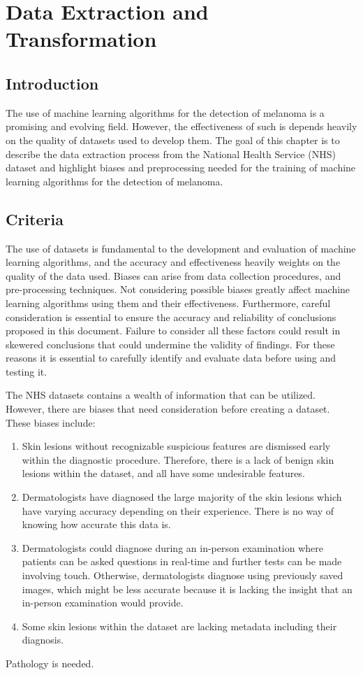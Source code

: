 \chapter{Data Extraction and Transformation}

\section{Introduction}
The use of machine learning algorithms for the detection of melanoma is a promising and evolving field. However, the effectiveness of such is depends heavily on the quality of datasets used to develop them. The goal of this chapter is to describe the data extraction process from the National Health Service (NHS) dataset and highlight biases and preprocessing needed for the training of machine learning algorithms for the detection of melanoma.  

\section{Criteria}
The use of datasets is fundamental to the development and evaluation of machine learning algorithms, and the accuracy and effectiveness heavily weights on the quality of the data used. Biases can arise from data collection procedures, and pre-processing techniques. Not considering possible biases greatly affect machine learning algorithms using them and their effectiveness. Furthermore, careful consideration is essential to ensure the accuracy and reliability of conclusions proposed in this document. Failure to consider all these factors could result in skewered conclusions that could undermine the validity of findings. For these reasons it is essential to carefully identify and evaluate data before using and testing it.

The NHS datasets contains a wealth of information that can be utilized. However, there are biases that need consideration before creating a dataset. These biases include:
\begin{enumerate}
    \item Skin lesions without recognizable suspicious features are dismissed early within the diagnostic procedure. Therefore, there is a lack of benign skin lesions within the dataset, and all have some undesirable features.
    \item Dermatologists have diagnosed the large majority of the skin lesions which have varying accuracy depending on their experience. There is no way of knowing how accurate this data is.
    \item Dermatologists could diagnose during an in-person examination where patients can be asked questions in real-time and further tests can be made involving touch. Otherwise, dermatologists diagnose using previously saved images, which might be less accurate because it is lacking the insight that an in-person examination would provide.
    \item Some skin lesions within the dataset are lacking metadata including their diagnosis.
\end{enumerate}

Pathology is needed.